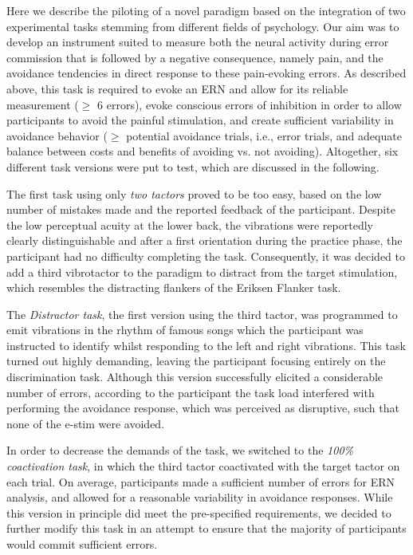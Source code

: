 \documentclass[twocolumn, serif, authordate, review]{jote-article}
\begin{document}
\noindent Here we describe the piloting of a novel paradigm based on the integration of two experimental tasks stemming from different fields of psychology. Our aim was to develop an instrument suited to measure both the neural activity during error commission that is followed by a negative consequence, namely pain, and the avoidance tendencies in direct response to these pain-evoking errors. As described above, this task is required to evoke an ERN and allow for its reliable measurement ($\mathrm{\ge}$ 6 errors), evoke conscious errors of inhibition in order to allow participants to avoid the painful stimulation, and create sufficient variability in avoidance behavior ($\mathrm{\ge}$ potential avoidance trials, i.e., error trials, and adequate balance between costs and benefits of avoiding vs. not avoiding). Altogether, six different task versions were put to test, which are discussed in the following.

The first task using only \textit{two tactors} proved to be too easy, based on the low number of mistakes made and the reported feedback of the participant. Despite the low perceptual acuity at the lower back, the vibrations were reportedly clearly distinguishable and after a first orientation during the practice phase, the participant had no difficulty completing the task. Consequently, it was decided to add a third vibrotactor to the paradigm to distract from the target stimulation, which resembles the distracting flankers of the Eriksen Flanker task.~

The \textit{Distractor task}, the first version using the third tactor, was programmed to emit vibrations in the rhythm of famous songs which the participant was instructed to identify whilst responding to the left and right vibrations. This task turned out highly demanding, leaving the participant focusing entirely on the discrimination task. Although this version successfully elicited a considerable number of errors, according to the participant the task load interfered with performing the avoidance response, which was perceived as disruptive, such that none of the e-stim were avoided.

In order to decrease the demands of the task, we switched to the \textit{100\% coactivation task}, in which the third tactor coactivated with the target tactor on each trial. On average, participants made a sufficient number of errors for ERN analysis, and allowed for a reasonable variability in avoidance responses. While this version in principle did meet the pre-specified requirements, we decided to further modify this task in an attempt to ensure that the majority of participants would commit sufficient errors.~
\end{document}
